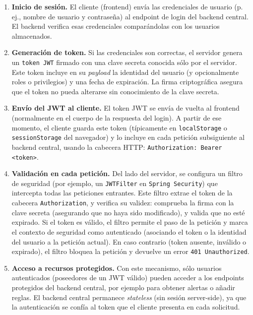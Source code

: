 \documentclass[11pt,a4paper,twoside]{report}
\begin{document}
\begin{enumerate}
	\item \textbf{Inicio de sesión.} El cliente (frontend) envía las credenciales de usuario (p. ej., nombre de usuario y contraseña) al endpoint de login del backend central. El backend verifica esas credenciales comparándolas con los usuarios almacenados.
	
	\item \textbf{Generación de token.} Si las credenciales son correctas, el servidor genera un \texttt{token JWT} firmado con una clave secreta conocida sólo por el servidor. Este token incluye en su \textit{payload} la identidad del usuario (y opcionalmente roles o privilegios) y una fecha de expiración. La firma criptográfica asegura que el token no pueda alterarse sin conocimiento de la clave secreta.
	
	\item \textbf{Envío del JWT al cliente.} El token JWT se envía de vuelta al frontend (normalmente en el cuerpo de la respuesta del login). A partir de ese momento, el cliente guarda este token (típicamente en \texttt{localStorage} o \texttt{sessionStorage} del navegador) y lo incluye en cada petición subsiguiente al backend central, usando la cabecera HTTP: \texttt{Authorization: Bearer <token>}.
	
	\item \textbf{Validación en cada petición.} Del lado del servidor, se configura un filtro de seguridad (por ejemplo, un \texttt{JWTFilter} en \texttt{Spring Security}) que intercepta todas las peticiones entrantes. Este filtro extrae el token de la cabecera \texttt{Authorization}, y verifica su validez: comprueba la firma con la clave secreta (asegurando que no haya sido modificado), y valida que no esté expirado. Si el token es válido, el filtro permite el paso de la petición y marca el contexto de seguridad como autenticado (asociando el token o la identidad del usuario a la petición actual). En caso contrario (token ausente, inválido o expirado), el filtro bloquea la petición y devuelve un error \texttt{401 Unauthorized}.
	
	\item \textbf{Acceso a recursos protegidos.} Con este mecanismo, sólo usuarios autenticados (poseedores de un JWT válido) pueden acceder a los endpoints protegidos del backend central, por ejemplo para obtener alertas o añadir reglas. El backend central permanece \textit{stateless} (sin sesión server-side), ya que la autenticación se confía al token que el cliente presenta en cada solicitud.
\end{enumerate}
\end{document}
